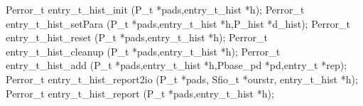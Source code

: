 \begin{code}
Perror\_t entry\_t\_hist\_init (P\_t *pads,entry\_t\_hist *h);
Perror\_t entry\_t\_hist\_setPara (P\_t *pads,entry\_t\_hist *h,P_hist *d_hist);
Perror\_t entry\_t\_hist\_reset (P\_t *pads,entry\_t\_hist *h);
Perror\_t entry\_t\_hist\_cleanup (P\_t *pads,entry\_t\_hist *h);
Perror\_t entry\_t\_hist\_add (P\_t *pads,entry\_t\_hist *h,Pbase\_pd
*pd,entry\_t *rep);
Perror\_t entry\_t\_hist\_report2io (P\_t *pads, Sfio\_t *ourstr,
entry\_t\_hist *h); 
Perror\_t entry\_t\_hist\_report (P\_t *pads,entry\_t\_hist *h);
\end{code}

